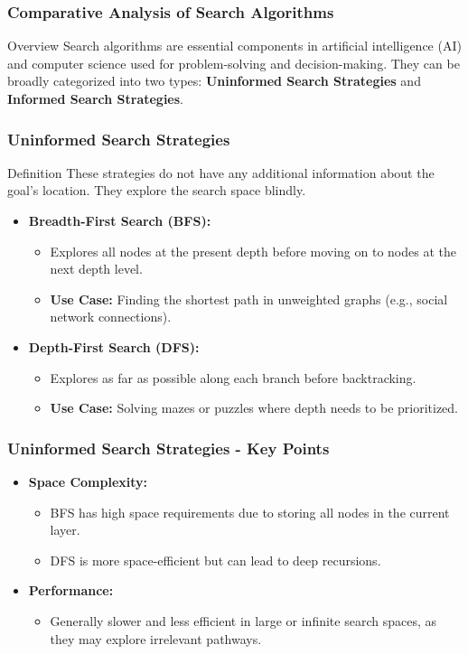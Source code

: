 \documentclass[aspectratio=169]{beamer}
\begin{document}
\begin{frame}[fragile]
    \frametitle{Comparative Analysis of Search Algorithms}
    \begin{block}{Overview}
        Search algorithms are essential components in artificial intelligence (AI) and computer science used for problem-solving and decision-making. They can be broadly categorized into two types: \textbf{Uninformed Search Strategies} and \textbf{Informed Search Strategies}.
    \end{block}
\end{frame}

\begin{frame}[fragile]
    \frametitle{Uninformed Search Strategies}
    \begin{block}{Definition}
        These strategies do not have any additional information about the goal's location. They explore the search space blindly.
    \end{block}
    \begin{itemize}
        \item \textbf{Breadth-First Search (BFS):}
        \begin{itemize}
            \item Explores all nodes at the present depth before moving on to nodes at the next depth level.
            \item \textbf{Use Case:} Finding the shortest path in unweighted graphs (e.g., social network connections).
        \end{itemize}
        \item \textbf{Depth-First Search (DFS):}
        \begin{itemize}
            \item Explores as far as possible along each branch before backtracking.
            \item \textbf{Use Case:} Solving mazes or puzzles where depth needs to be prioritized.
        \end{itemize}
    \end{itemize}
\end{frame}

\begin{frame}[fragile]
    \frametitle{Uninformed Search Strategies - Key Points}
    \begin{itemize}
        \item \textbf{Space Complexity:}
        \begin{itemize}
            \item BFS has high space requirements due to storing all nodes in the current layer.
            \item DFS is more space-efficient but can lead to deep recursions.
        \end{itemize}
        \item \textbf{Performance:}
            \begin{itemize}
                \item Generally slower and less efficient in large or infinite search spaces, as they may explore irrelevant pathways.
            \end{itemize}
    \end{itemize}
\end{frame}
\end{document}
